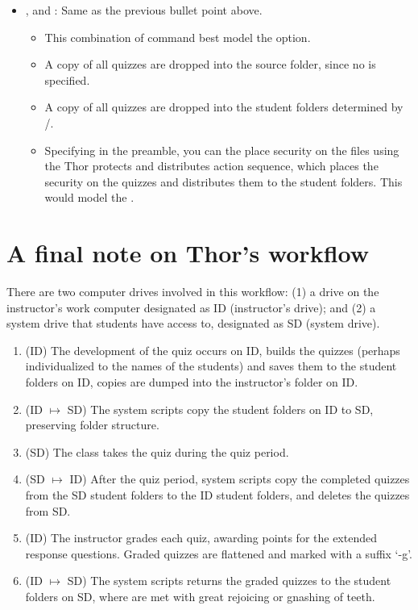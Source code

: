 \documentclass{article}
\makeatletter
\def\heshe{\@ifstar{\heshei}{\global\advance\hesheCnt1\relax\heshei}}
\def\heshei{\ifodd\hesheCnt she\else he\fi}
\makeatother
\begin{document}
\begin{itemize}
  \item {}, and
      : Same as the previous bullet point above.
      \begin{itemize}
      \item This combination of command best model the  option.
      \item A copy of all quizzes are dropped into the source folder,
          since no  is specified.
      \item A copy of all quizzes are dropped into the student folders determined by
          /.
      \item Specifying  in the preamble, you can
          the place security on the files using the \textsf{Thor protects
          and distributes} action sequence, which places the security on
          the quizzes and distributes them to the student folders. This
          would model the .
      \end{itemize}


\end{itemize}


\section{A final note on Thor's workflow}

There are two computer drives involved in this workflow: (1) a drive on the
instructor's work computer designated as ID (instructor's drive); and (2) a
system drive that students have access to, designated as SD (system drive).
\begin{enumerate}
\item (ID) The development of the quiz occurs on ID, {\heshe} builds the
    quizzes (perhaps individualized to the names of the students) and saves
    them to the student folders on ID, copies are dumped into the
    instructor's folder on ID.
\item (ID $\mapsto$ SD) The system scripts copy the student folders on ID to
    SD, preserving folder structure.
\item (SD) The class takes the quiz during the quiz period.
\item (SD $\mapsto$ ID) After the quiz period, system scripts copy the
    completed quizzes from the SD student folders to the ID student
    folders, and deletes the quizzes from SD.
\item (ID) The instructor grades each quiz, awarding points for the
    extended response questions. Graded quizzes are flattened and marked
    with a suffix `-g'.
\item (ID $\mapsto$ SD) The system scripts returns the graded quizzes to
    the student folders on SD, where are met with great rejoicing or
    gnashing of teeth.
\end{enumerate}
\end{document}
